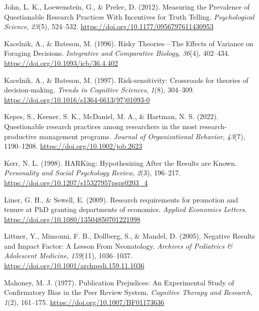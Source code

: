 \documentclass[
  ,man,mask,floatsintext]{apa6}
\newlength{\cslhangindent}
\newlength{\cslentryspacingunit} %
\newenvironment{CSLReferences}[2] %
 {%
  \setlength{\parindent}{0pt}
  \ifodd #1
  \let\oldpar\par
  \def\par{\hangindent=\cslhangindent\oldpar}
  \fi
  \setlength{\parskip}{#2\cslentryspacingunit}
 }%
 {}
\begin{document}
\begin{CSLReferences}{1}{0}
\leavevmode{}%
John, L. K., Loewenstein, G., \& Prelec, D. (2012). Measuring the {Prevalence} of {Questionable Research Practices With Incentives} for {Truth Telling}. \emph{Psychological Science}, \emph{23}(5), 524--532. \url{https://doi.org/10.1177/0956797611430953}

\leavevmode{}%
Kacelnik, A., \& Bateson, M. (1996). Risky {Theories}---{The Effects} of {Variance} on {Foraging Decisions}. \emph{Integrative and Comparative Biology}, \emph{36}(4), 402--434. \url{https://doi.org/10.1093/icb/36.4.402}

\leavevmode{}%
Kacelnik, A., \& Bateson, M. (1997). Risk-sensitivity: Crossroads for theories of decision-making. \emph{Trends in Cognitive Sciences}, \emph{1}(8), 304--309. \url{https://doi.org/10.1016/s1364-6613(97)01093-0}

\leavevmode{}%
Kepes, S., Keener, S. K., McDaniel, M. A., \& Hartman, N. S. (2022). Questionable research practices among researchers in the most research-productive management programs. \emph{Journal of Organizational Behavior}, \emph{43}(7), 1190--1208. \url{https://doi.org/10.1002/job.2623}

\leavevmode{}%
Kerr, N. L. (1998). {HARKing}: {Hypothesizing After} the {Results} are {Known}. \emph{Personality and Social Psychology Review}, \emph{2}(3), 196--217. \url{https://doi.org/10.1207/s15327957pspr0203_4}

\leavevmode{}%
Liner, G. H., \& Sewell, E. (2009). Research requirements for promotion and tenure at {PhD} granting departments of economics. \emph{Applied Economics Letters}. \url{https://doi.org/10.1080/13504850701221998}

\leavevmode{}%
Littner, Y., Mimouni, F. B., Dollberg, S., \& Mandel, D. (2005). Negative {Results} and {Impact Factor}: {A Lesson From Neonatology}. \emph{Archives of Pediatrics \& Adolescent Medicine}, \emph{159}(11), 1036--1037. \url{https://doi.org/10.1001/archpedi.159.11.1036}

\leavevmode{}%
Mahoney, M. J. (1977). Publication {Prejudices}: {An Experimental Study} of {Confirmatory Bias} in the {Peer Review System}. \emph{Cognitive Therapy and Research}, \emph{1}(2), 161--175. \url{https://doi.org/10.1007/BF01173636}


\end{CSLReferences}
\end{document}

